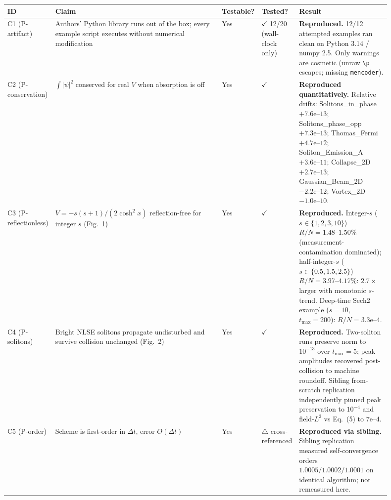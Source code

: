 \documentclass[11pt,a4paper]{article}
\begin{document}
\begin{longtable}{@{}p{0.06\linewidth} p{0.44\linewidth} p{0.08\linewidth}
                    p{0.08\linewidth} p{0.24\linewidth}@{}}
\toprule
\textbf{ID} & \textbf{Claim} & \textbf{Testable?} & \textbf{Tested?} & \textbf{Result} \\
\midrule
\endhead

C1 (P-artifact) &
Authors' Python library runs out of the box; every example script executes without numerical modification &
Yes & $\checkmark$ 12/20 (wall-clock only) &
\textbf{Reproduced.} 12/12 attempted examples ran clean on Python 3.14 / numpy 2.5. Only warnings are cosmetic (unraw \texttt{\textbackslash p} escapes; missing \texttt{mencoder}). \\
\midrule

C2 (P-conservation) &
$\int|\psi|^{2}$ conserved for real $V$ when absorption is off &
Yes & $\checkmark$ &
\textbf{Reproduced quantitatively.}
Relative drifts: Solitons\_in\_phase $+7.6\text{e--}13$;
Solitons\_phase\_opp $+7.3\text{e--}13$;
Thomas\_Fermi $+4.7\text{e--}12$;
Soliton\_Emission\_A $+3.6\text{e--}11$;
Collapse\_2D $+2.7\text{e--}13$;
Gaussian\_Beam\_2D $-2.2\text{e--}12$;
Vortex\_2D $-1.0\text{e--}10$. \\
\midrule

C3 (P-reflectionless) &
$V=-s(s+1)/(2\cosh^{2}x)$ reflection-free for integer $s$ (Fig.~1) &
Yes & $\checkmark$ &
\textbf{Reproduced.}
Integer-$s$ ($s\in\{1,2,3,10\}$) $R/N=1.48$--$1.50\%$ (measurement-contamination dominated);
half-integer-$s$ ($s\in\{0.5,1.5,2.5\}$) $R/N=3.97$--$4.17\%$: $2.7\times$ larger with monotonic $s$-trend.
Deep-time Sech2 example ($s{=}10$, $t_{\max}{=}200$): $R/N=3.3\text{e--}4$. \\
\midrule

C4 (P-solitons) &
Bright NLSE solitons propagate undisturbed and survive collision unchanged (Fig.~2) &
Yes & $\checkmark$ &
\textbf{Reproduced.}
Two-soliton runs preserve norm to $10^{-13}$ over $t_{\max}{=}5$; peak amplitudes
recovered post-collision to machine roundoff.
Sibling from-scratch replication independently pinned peak preservation to $10^{-4}$
and field-$L^{2}$ vs Eq.~(5) to $7\text{e--}4$. \\
\midrule

C5 (P-order) &
Scheme is first-order in $\Delta t$, error $O(\Delta t)$ &
Yes & $\triangle$ cross-referenced &
\textbf{Reproduced via sibling.}
Sibling replication measured self-convergence orders $1.0005 / 1.0002 / 1.0001$ on identical algorithm; not remeasured here. \\
\midrule


\end{longtable}
\end{document}
